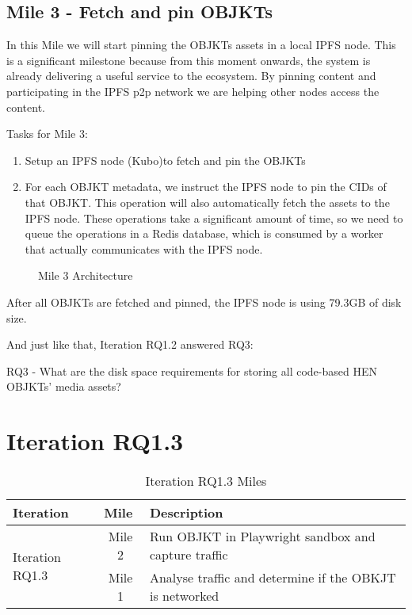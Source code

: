 \subsection {Mile 3 - Fetch and pin OBJKTs}

In this Mile we will start pinning the OBJKTs assets in a local IPFS node. This is a significant milestone because from this moment onwards, the system is already delivering a useful service to the ecosystem. By pinning content and participating in the IPFS p2p network we are helping other nodes access the content.

Tasks for Mile 3:
\begin{enumerate}
	\item Setup an IPFS node (Kubo)\footnotemark[8] to fetch and pin the OBJKTs
	\item For each OBJKT metadata, we instruct the IPFS node to pin the CIDs of that OBJKT. This operation will also automatically fetch the assets to the IPFS node. These operations take a significant amount of time, so we need to queue the operations in a Redis database, which is consumed by a worker that actually communicates with the IPFS node.
\end{enumerate}




\begin{figure}[h]
    \centering
    
    \caption[Mile 3 Architecture]{Mile 3 Architecture}
    \label{fig:mile3-arch}
\end{figure}


After all OBJKTs are fetched and pinned, the IPFS node is using 79.3GB of disk size.

\label{txt:rq3-answered}
And just like that, Iteration RQ1.2 answered RQ3:

\vspace{0.5cm}
RQ3 - What are the disk space requirements for storing all code-based HEN OBJKTs’ media assets?
\vspace{0.5cm}

\section {Iteration RQ1.3}


\begin{table}[h]
\footnotesize
\centering
\begin{tabular}{|l|c|l|}
\hline
\textbf{Iteration}        & \multicolumn{1}{l|}{\textbf{Mile}} & \textbf{Description}                                         \\ \hline
\multirow{2}{*}{Iteration RQ1.3} & Mile 2                              & Run OBJKT in Playwright sandbox and capture traffic          \\ \cline{2-3} 
                             & Mile 1                              & Analyse traffic and determine if the OBKJT is networked      \\ \hline
\end{tabular}
\caption{Iteration RQ1.3 Miles}
\end{table}



